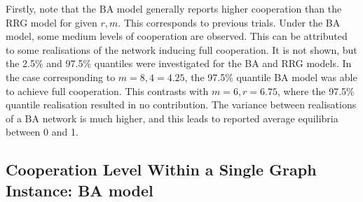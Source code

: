 Firstly, note that the BA model generally reports higher cooperation than the RRG model for given $r,m$. This corresponds to previous trials. Under the BA model, some medium levels of cooperation are observed. This can be attributed to some realisations of the network inducing full cooperation. It is not shown, but the 2.5\% and 97.5\% quantiles were investigated for the BA and RRG models. In the case corresponding to $m=8, 4 = 4.25$, the 97.5\% quantile BA model was able to achieve full cooperation. This contrasts with $m=6, r = 6.75$, where the 97.5\% quantile realisation resulted in no contribution. The variance between realisations of a BA network is much higher, and this leads to reported average equilibria between 0 and 1. 

\subsection{Cooperation Level Within a Single Graph Instance: BA model } 


